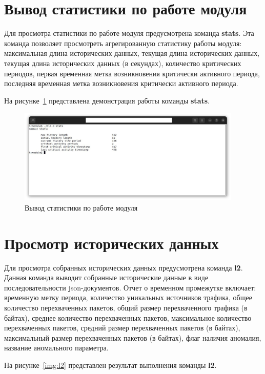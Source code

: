 \documentclass{bmstu}
\begin{document}
\section{Вывод статистики по работе модуля}
Для просмотра статистики по работе модуля предусмотрена команда \textbf{stats}. Эта команда позволяет просмотреть агрегированную статистику работы модуля: максимальная длина исторических данных, текущая длина исторических данных, текущая длина исторических данных (в секундах), количество критических периодов, первая временная метка возникновения критически активного периода, последняя временная метка возникновения критически активного периода.

На рисунке~\ref{img:stats} представлена демонстрация работы команды \textbf{stats}.   

\begin{figure}[hbtp]
 \centering
 \includegraphics[width=0.95\textwidth]{inc/img/stats.jpg}
 \caption{Вывод статистики по работе модуля}
 \label{img:stats}
\end{figure}

\section{Просмотр исторических данных}
Для просмотра собранных исторических данных предусмотрена команда \textbf{l2}. Данная команда выводит собранные исторические данные в виде последовательности json-документов. Отчет о временном промежутке включает: временную метку периода, количество уникальных источников трафика, общее количество перехваченных пакетов, общий размер перехваченного трафика (в байтах), среднее количество перехваченных пакетов, максимальное количество перехваченных пакетов, средний размер перехваченных пакетов (в байтах), максимальный размер перехваченных пакетов (в байтах), флаг наличия аномалия, название аномального параметра.

На рисунке~\ref{img:l2} представлен результат выполнения команды \textbf{l2}.
\end{document}
